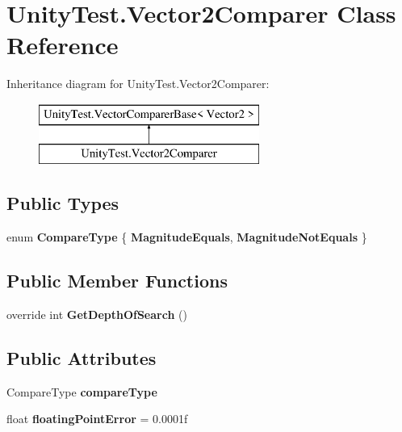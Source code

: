 \hypertarget{class_unity_test_1_1_vector2_comparer}{}\section{Unity\+Test.\+Vector2\+Comparer Class Reference}
\label{class_unity_test_1_1_vector2_comparer}
Inheritance diagram for Unity\+Test.\+Vector2\+Comparer\+:\begin{figure}[H]
\begin{center}
\leavevmode
\includegraphics[height=2.000000cm]{class_unity_test_1_1_vector2_comparer}
\end{center}
\end{figure}
\subsection*{Public Types}
\begin{DoxyCompactItemize}
\item 
\mbox{\label{class_unity_test_1_1_vector2_comparer_a774fabfe92947b46e6f67f12ef7e315d}} 
enum {\bfseries Compare\+Type} \{ {\bfseries Magnitude\+Equals}, 
{\bfseries Magnitude\+Not\+Equals}
 \}
\end{DoxyCompactItemize}
\subsection*{Public Member Functions}
\begin{DoxyCompactItemize}
\item 
\mbox{\label{class_unity_test_1_1_vector2_comparer_ace2e42db4fa9f459b6703d8f350aaf7b}} 
override int {\bfseries Get\+Depth\+Of\+Search} ()
\end{DoxyCompactItemize}
\subsection*{Public Attributes}
\begin{DoxyCompactItemize}
\item 
\mbox{\label{class_unity_test_1_1_vector2_comparer_a34880068412a7cc3b0a624a7433788a9}} 
Compare\+Type {\bfseries compare\+Type}
\item 
\mbox{\label{class_unity_test_1_1_vector2_comparer_aa27028f44c8b43b8b31c1e3f4dcbf07b}} 
float {\bfseries floating\+Point\+Error} = 0.\+0001f
\end{DoxyCompactItemize}
